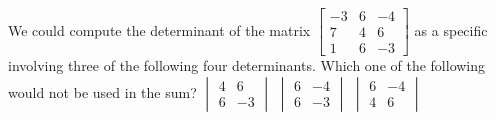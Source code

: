 \begin{activity}
We could compute the determinant of the matrix 
\(\begin{bmatrix} -3&6&-4
\\7&4&6
\\1&6&-3 \end{bmatrix}\)  
as a specific  involving three of the following four determinants.  
Which one of the following would not be used in the sum?
{\(\begin{vmatrix} 4&6\\6&-3 \end{vmatrix}\)}
{\(\begin{vmatrix} 6&-4\\6&-3 \end{vmatrix}\)}
{\(\begin{vmatrix} 6&-4\\4&6 \end{vmatrix}\)}
\end{activity}




